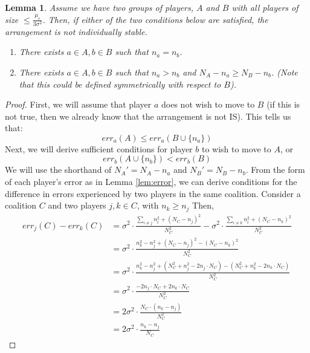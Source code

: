 \documentclass{article}
\newcommand{\cd}[0]{\cdot}
\newtheorem{lemma}{Lemma}
\newcommand{\mue}[0]{\ensuremath{\mu_e}}
\newcommand{\var}[0]{\ensuremath{\sigma^2}}
\newcommand{\ndraw}[0]{\ensuremath{n}}
\newcommand{\total}[0]{\ensuremath{N}}
\newcommand{\col}[0]{\ensuremath{C}}
\begin{document}
\begin{lemma}\label{lem:case12}
Assume we have two groups of players, $A$ and $B$ with all players of size $\leq \frac{\mue}{3\var}$. Then, if either of the two conditions below are satisfied, the arrangement is not individually stable. 
\begin{enumerate}
    \item There exists $a \in A, b \in B$ such that $\ndraw_a = \ndraw_b$. 
    \item There exists $a \in A, b \in B$ such that $\ndraw_a > \ndraw_b$ and $\total_A - \ndraw_a \geq \total_B - \ndraw_b$. (Note that this could be defined symmetrically with respect to $B$). 
\end{enumerate}
\end{lemma}
\begin{proof}
First, we will assume that player $a$ does not wish to move to $B$ (if this is not true, then we already know that the arrangement is not IS). This tells us that: 
$$err_a(A) \leq err_a(B \cup \{\ndraw_a\})$$
Next, we will derive sufficient conditions for player $b$ to wish to move to $A$, or 
$$err_b(A \cup \{\ndraw_b\}) <err_b(B)$$
We will use the shorthand of $\total_A' = \total_A - \ndraw_a$ and $\total_B' = \total_B - \ndraw_b$. From the form of each player's error as in Lemma \ref{lem:error}, we can derive conditions for the difference in errors experienced by two players in the same coalition. Consider a coalition $\col$ and two players $j, k \in \col$, with $\ndraw_k \geq \ndraw_j$ Then, 
\begin{align*}
err_j(\col) - err_k(\col) &= \var \cd \frac{\sum_{i \ne j} \ndraw_i^2 +(\total_{\col} - \ndraw_j)^2}{\total_{\col}^2} -  \var \cd \frac{\sum_{i \ne k} \ndraw_i^2 + (\total_{\col} - \ndraw_k)^2}{\total_{\col}^2}\\
&= \var \cd \frac{\ndraw_k^2 - \ndraw_j^2 +(\total_{\col} - \ndraw_j)^2 - (\total_{\col} - \ndraw_k)^2}{\total_{\col}^2}\\
&=\var \cd \frac{\ndraw_k^2 - \ndraw_j^2 +(\total_{\col}^2 + \ndraw_j^2 - 2 \ndraw_j \cd \total_{\col}) - (\total_{\col}^2 + \ndraw_k^2 -2 \ndraw_k \cd \total_{\col})}{\total_{\col}^2}\\
&=\var \cd \frac{- 2 \ndraw_j \cd \total_{\col} +2 \ndraw_k \cd \total_{\col}}{\total_{\col}^2}\\
&= 2\var \cd \frac{\total_{\col} \cd (\ndraw_k - \ndraw_j)}{\total_{\col}^2} \\
&= 2 \var \cd \frac{\ndraw_k - \ndraw_j}{\total_{\col}}
\end{align*}

\end{proof}
\end{document}

